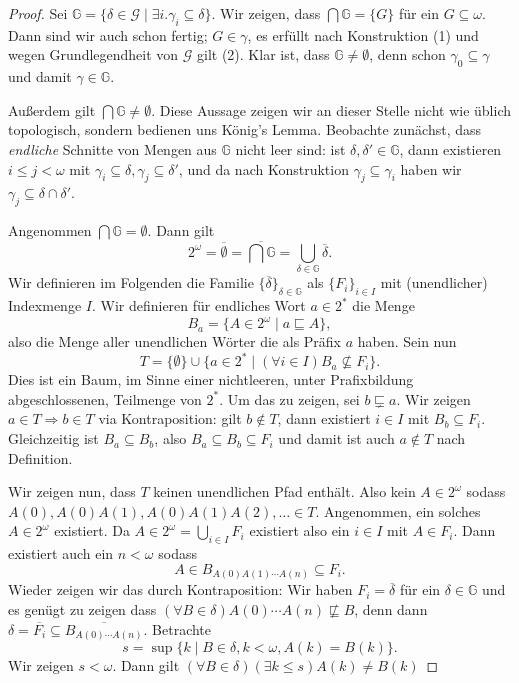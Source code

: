 \documentclass[nofonts]{uebung}
\begin{document}
\begin{proof}
    Sei $\mathbb G=\{ \delta\in \mathcal G \mid \exists i. \gamma_i\subseteq \delta \}$. Wir zeigen, dass $\bigcap \mathbb G = \{G\}$ für ein $G\subseteq\omega$.
    Dann sind wir auch schon fertig; $G\in\gamma$, es erfüllt nach Konstruktion (1) und wegen Grundlegendheit von $\mathcal G$ gilt (2).
    Klar ist, dass $\mathbb G \neq \emptyset$, denn schon $\gamma_0 \subseteq \gamma $ und damit $\gamma\in \mathbb G$.
    
    Außerdem gilt $\bigcap \mathbb G \neq \emptyset$. Diese Aussage zeigen wir an dieser Stelle nicht wie üblich topologisch, sondern bedienen uns König's Lemma.
    Beobachte zunächst, dass \emph{endliche} Schnitte von Mengen aus $\mathbb G$ nicht leer sind: ist $\delta, \delta' \in \mathbb G$, dann existieren $i\leq j<\omega$ mit $\gamma_i\subseteq \delta, \gamma_j\subseteq \delta'$, und da nach Konstruktion $\gamma_j\subseteq \gamma_i$ haben wir $\gamma_j\subseteq \delta\cap \delta'$.

    Angenommen $\bigcap\mathbb G=\emptyset$. Dann gilt \[ 2^\omega=\overline{\emptyset}=\overline{\bigcap\mathbb G} = \bigcup_{\delta\in \mathbb G} \overline{\delta}. \]
    Wir definieren im Folgenden die Familie $\{ \overline{\delta} \}_{\delta\in\mathbb G}$ als $\{F_i\}_{i\in I}$ mit (unendlicher) Indexmenge $I$.
    Wir definieren für endliches Wort $a\in 2^*$ die Menge
    \[ B_a = \{ A\in 2^\omega \mid a\sqsubseteq A \}, \]
    also die Menge aller unendlichen Wörter die als Präfix $a$ haben.
    Sein nun
    \[ T = \{\emptyset\} \cup \{ a\in 2^* \mid (\forall i\in I) B_a\not\subseteq F_i \}. \]
    Dies ist ein Baum, im Sinne einer nichtleeren, unter Prafixbildung abgeschlossenen, Teilmenge von $2^*$. Um das zu zeigen, sei $b\sqsubsetneq a$. Wir zeigen $a\in T \Rightarrow b\in T$ via Kontraposition:
    gilt $b\not\in T$, dann existiert $i\in I$ mit $B_b\subseteq F_i$. Gleichzeitig ist $B_a\subseteq B_b$, also $B_a\subseteq B_b\subseteq F_i$ und damit ist auch $a\not\in T$ nach Definition.

    Wir zeigen nun, dass $T$ keinen unendlichen Pfad enthält. Also kein $A\in 2^\omega$ sodass $A(0), A(0)A(1), A(0)A(1)A(2), \ldots\in T$.
    Angenommen, ein solches $A\in 2^\omega$ existiert.
    Da $A\in 2^\omega=\bigcup_{i\in I}F_i$ existiert also ein $i\in I$ mit $A\in F_i$.
    Dann existiert auch ein $n<\omega$ sodass
    \[ A\in B_{A(0)A(1)\cdots A(n)} \subseteq F_i. \]
    Wieder zeigen wir das durch Kontraposition: Wir haben $F_i=\overline{\delta}$ für ein $\delta\in\mathbb G$ und es genügt zu zeigen dass $(\forall B\in\delta) A(0)\cdots A(n)\not\sqsubseteq B$, denn dann $\delta=\overline{F_i} \subseteq \overline{B_{A(0)\cdots A(n)}}$.
    Betrachte
    \[ s = \sup \{ k \mid B\in\delta, k<\omega, A(k)=B(k) \}. \]
    Wir zeigen $s<\omega$. Dann gilt $(\forall B\in\delta)(\exists k\leq s)A(k)\neq B(k)$ 


\end{proof}
\end{document}
